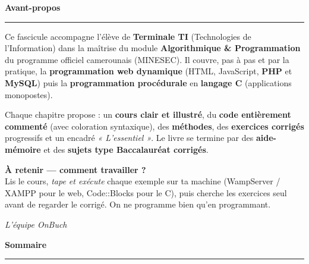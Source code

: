\documentclass[11pt,a4paper,openany]{book}
\begin{document}

\frontmatter

\thispagestyle{empty}
\vspace*{0.5cm}
{\sffamily\fontsize{28}{30}\selectfont\bfseries\color{onbink} Avant-propos}\par\vspace{4pt}
{\color{onbo}\rule{5cm}{2.5pt}}\par\vspace{14pt}
\noindent Ce fascicule accompagne l'élève de \textbf{Terminale TI} (Technologies de
l'Information) dans la maîtrise du module \textbf{Algorithmique \& Programmation} du
programme officiel camerounais (MINESEC). Il couvre, pas à pas et par la pratique,
la \textbf{programmation web dynamique} (HTML, JavaScript, \textbf{PHP} et \textbf{MySQL})
puis la \textbf{programmation procédurale} en \textbf{langage C} (applications monopostes).

\medskip
\noindent Chaque chapitre propose : un \textbf{cours clair et illustré}, du \textbf{code
entièrement commenté} (avec coloration syntaxique), des \textbf{méthodes}, des
\textbf{exercices corrigés} progressifs et un encadré \emph{« L'essentiel »}. Le livre
se termine par des \textbf{aide-mémoire} et des \textbf{sujets type Baccalauréat corrigés}.

\medskip
\begingroup\setlength{\fboxsep}{12pt}%
\noindent\colorbox{onbsoft}{\parbox{\dimexpr\linewidth-2\fboxsep\relax}{%
{\sffamily\bfseries\color{onbo}À retenir — comment travailler ?}\\[2pt]
Lis le cours, \emph{tape et exécute} chaque exemple sur ta machine (WampServer / XAMPP
pour le web, Code::Blocks pour le C), puis cherche les exercices seul avant de regarder
le corrigé. On ne programme bien qu'en programmant.}}%
\endgroup\par

\medskip
\hfill{\sffamily\itshape\color{onbmuted} L'équipe OnBuch}
\clearpage

\thispagestyle{empty}
\vspace*{0.4cm}
{\sffamily\fontsize{28}{30}\selectfont\bfseries\color{onbink} Sommaire}\par\vspace{4pt}
{\color{onbo}\rule{5cm}{2.5pt}}\par\vspace{8pt}
{\hypersetup{linkcolor=onbink}\makeatletter{}\makeatother}

\mainmatter












\appendix


\end{document}
